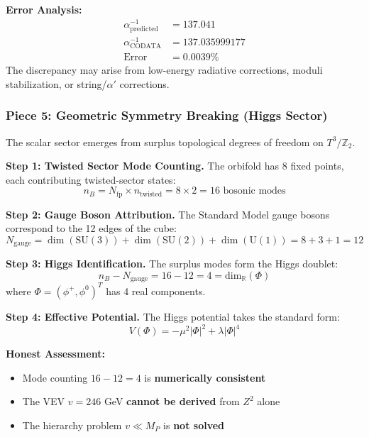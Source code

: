 \documentclass[12pt,a4paper]{article}
\newcommand{\Ztwo}{\mathbb{Z}_2}
\newcommand{\Tthree}{T^3}
\newcommand{\Zsq}{Z^2}
\begin{document}
\textbf{Error Analysis:}
\begin{align}
\alpha^{-1}_{\text{predicted}} &= 137.041 \\
\alpha^{-1}_{\text{CODATA}} &= 137.035999177 \\
\text{Error} &= 0.0039\%
\end{align}
The discrepancy may arise from low-energy radiative corrections, moduli stabilization, or string/$\alpha'$ corrections.

\subsubsection{Piece 5: Geometric Symmetry Breaking (Higgs Sector)}

The scalar sector emerges from surplus topological degrees of freedom on $\Tthree/\Ztwo$.

\textbf{Step 1: Twisted Sector Mode Counting.}
The orbifold has 8 fixed points, each contributing twisted-sector states:
\begin{equation}
n_B = N_{\text{fp}} \times n_{\text{twisted}} = 8 \times 2 = 16 \text{ bosonic modes}
\end{equation}

\textbf{Step 2: Gauge Boson Attribution.}
The Standard Model gauge bosons correspond to the 12 edges of the cube:
\begin{equation}
N_{\text{gauge}} = \dim(\text{SU}(3)) + \dim(\text{SU}(2)) + \dim(\text{U}(1)) = 8 + 3 + 1 = 12
\end{equation}

\textbf{Step 3: Higgs Identification.}
The surplus modes form the Higgs doublet:
\begin{equation}
n_B - N_{\text{gauge}} = 16 - 12 = 4 = \text{dim}_\mathbb{R}(\Phi)
\end{equation}
where $\Phi = (\phi^+, \phi^0)^T$ has 4 real components.

\textbf{Step 4: Effective Potential.}
The Higgs potential takes the standard form:
\begin{equation}
V(\Phi) = -\mu^2|\Phi|^2 + \lambda|\Phi|^4
\end{equation}

\textbf{Honest Assessment:}
\begin{itemize}[itemsep=0pt]
    \item[\checkmark] Mode counting $16 - 12 = 4$ is \textbf{numerically consistent}
    \item[$\times$] The VEV $v = 246$ GeV \textbf{cannot be derived} from $\Zsq$ alone
    \item[$\times$] The hierarchy problem $v \ll M_P$ is \textbf{not solved}
\end{itemize}
\end{document}
